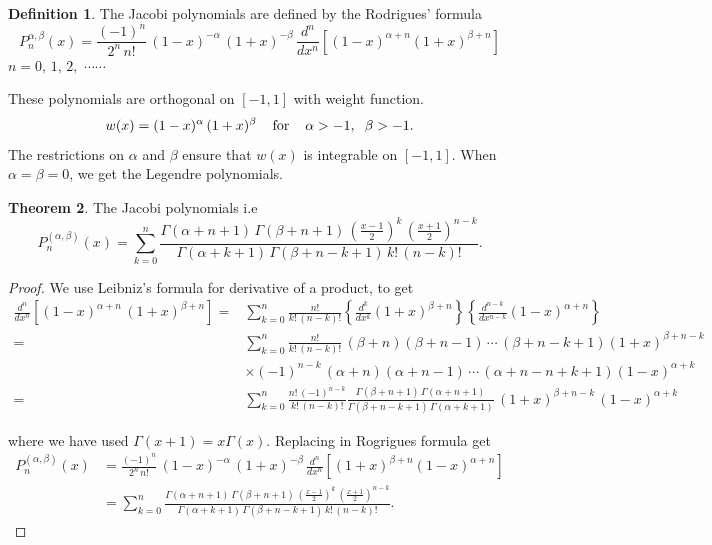 \documentclass[12pt,a4paper]{report}
\theoremstyle{definition}
\newtheorem{thm}{Theorem}[section]
\newtheorem{defn}[thm]{Definition}
\theoremstyle{plain}
\begin{document}
\begin{defn}
The Jacobi polynomials are defined by the Rodrigues' formula $$P_n^{\alpha,\beta}(x) = \frac{(-1)^n}{2^n\, n!}\, (1 - x)^{-\alpha}\, (1 + x)^{-\beta}\, \frac{d^n}{dx^n}\left[(1 - x)^{\alpha + n}(1 + x)^{\beta + n}\right]$$ 
$n = 0, \, 1, \, 2, \, \, \cdots\cdots$

These polynomials are orthogonal on $[-1,1]$ with weight function.
$$w(x) = (1 - x)^{\alpha}\, (1 + x)^{\beta}\hspace{0.4cm}\text{for}\hspace{0.4cm} \alpha > -1, \hspace{0.2cm} \beta > -1.$$
The restrictions on $\alpha$ and $\beta$ ensure that $w(x)$ is integrable on $[-1,1]$. When $\alpha = \beta = 0$, we get the Legendre polynomials.
\end{defn}



\begin{thm}
The Jacobi polynomials i.e $$P_n^{(\alpha,\beta)} (x)  = \sum_{k = 0}^n \frac{\Gamma(\alpha + n + 1)\, \Gamma(\beta + n + 1)\, \left(\frac{x - 1}{2}\right)^k\, \left(\frac{x + 1}{2}\right)^{n - k}}{\Gamma (\alpha + k + 1)\, \Gamma (\beta + n - k + 1)\, k!\, (n-k)!}.$$
\end{thm}

\begin{proof}
We use Leibniz's formula for derivative of a product, to get
\begin{align*}
\frac{d^n}{dx^n}\left[(1 - x)^{\alpha + n}\, (1 + x)^{\beta + n}\right]  = & \sum^n_{k=0} \frac{n!}{k!\, (n-k)!}\left\{\frac{d^k}{dx^k}(1  + x)^{\beta + n}\right\}\left\{\frac{d^{n-k}}{dx^{n-k}}(1 - x)^{\alpha + n}\right\}\\
 = & \sum^n_{k=0}\frac{n!}{k!\, (n-k)!}\, (\beta + n)(\beta + n -1)\, \cdots\, (\beta + n - k + 1)(1+x)^{\beta + n - k}\\
   & \times (-1)^{n-k}\, (\alpha + n)(\alpha + n - 1)\, \cdots\, (\alpha + n - n + k + 1)(1 - x)^{\alpha + k}\\
 = & \sum^n_{k = 0} \frac{n!\, (-1)^{n-k}}{k!\, (n-k)!}\frac{\Gamma(\beta + n + 1)\, \Gamma(\alpha + n + 1)}{\Gamma(\beta + n - k + 1)\, \Gamma(\alpha + k + 1)}\, (1 + x)^{\beta + n - k}\, (1 - x)^{\alpha + k}
\end{align*}

where we have used $\Gamma(x + 1) = x\Gamma(x)$. Replacing in Rogrigues formula get
\begin{align*}
P_n^{(\alpha,\beta)}(x) & = \frac{(-1)^n}{2^n\, n!}\, (1 - x)^{-\alpha}\, (1 + x)^{-\beta}\, \frac{d^n}{dx^n}\left[(1 + x)^{\beta + n}(1 - x)^{\alpha + n}\right]\\
& = \sum^n_{k=0}\frac{\Gamma(\alpha + n  + 1)\, \Gamma(\beta + n + 1)\, \left(\frac{x - 1}{2}\right)^k\, \left(\frac{x + 1}{2}\right)^{n-k}}{\Gamma(\alpha + k + 1)\, \Gamma (\beta + n-k +1)\, k!\, (n-k)!}.
\end{align*}
\end{proof}
\end{document}

